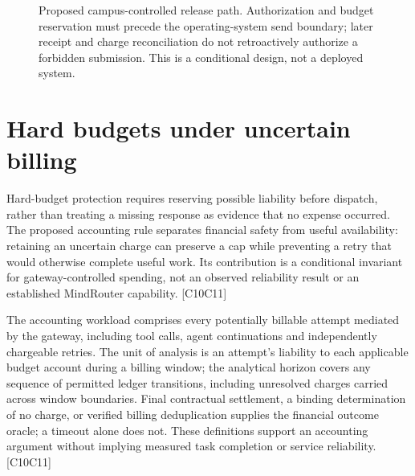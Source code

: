 \documentclass[11pt]{article}
\begin{document}
\begin{figure}[!htbp]
\centering
{}
\caption{Proposed campus-controlled release path. Authorization and budget reservation must precede the operating-system send boundary; later receipt and charge reconciliation do not retroactively authorize a forbidden submission. This is a conditional design, not a deployed system.}
\par{}
\end{figure}
\section{Hard budgets under uncertain billing}
Hard-budget protection requires reserving possible liability before dispatch, rather than treating a missing response as evidence that no expense occurred. The proposed accounting rule separates financial safety from useful availability: retaining an uncertain charge can preserve a cap while preventing a retry that would otherwise complete useful work. Its contribution is a conditional invariant for gateway-controlled spending, not an observed reliability result or an established MindRouter capability. [C10\textendash{}\allowbreak{}C11]

The accounting workload comprises every potentially billable attempt mediated by the gateway, including tool calls, agent continuations and independently chargeable retries. The unit of analysis is an attempt\textquoteright{}s liability to each applicable budget account during a billing window; the analytical horizon covers any sequence of permitted ledger transitions, including unresolved charges carried across window boundaries. Final contractual settlement, a binding determination of no charge, or verified billing deduplication supplies the financial outcome oracle; a timeout alone does not. These definitions support an accounting argument without implying measured task completion or service reliability. [C10\textendash{}\allowbreak{}C11]
\end{document}

